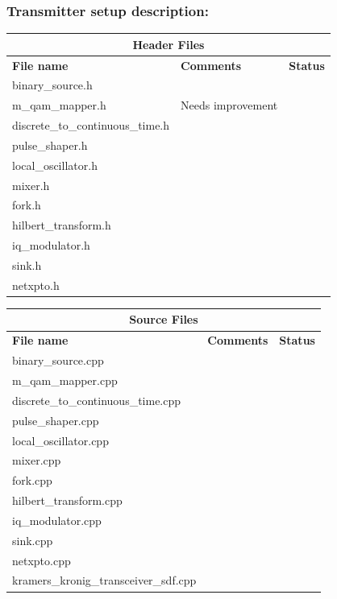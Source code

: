 \subsubsection{Transmitter setup description:}
\begin{center}
	\begin{tabular}{ |p{6cm}||p{7cm}|p{1cm}|   }
		\hline
		\multicolumn{3}{|c|}{\textbf{Header Files}} \\
		\hline
		\textbf{File name} & \textbf{Comments}&\textbf{Status}\\
		\hline
		binary\_source.h    				&  &\checkmark\\
		\hline
		m\_qam\_mapper.h 					& Needs improvement &\\
		\hline
		discrete\_to\_continuous\_time.h    &  &\checkmark\\
		\hline
		pulse\_shaper.h 					&  &\checkmark\\
		\hline
		local\_oscillator.h					&  &\checkmark\\
		\hline
		mixer.h		 						&  &\\
		\hline
		fork.h								&  &\\
		\hline
		hilbert\_transform.h				&  &\\
		\hline
		iq\_modulator.h						&  &\checkmark\\
		\hline
		sink.h								&  &\checkmark\\
		\hline
		netxpto.h							&  &\checkmark\\
		\hline
	\end{tabular}
\end{center}
\vspace{0.4cm}
\begin{center}
	\begin{tabular}{ |p{6cm}||p{7cm}|p{1cm}|   }
		\hline
		\multicolumn{3}{|c|}{\textbf{Source Files}} \\
		\hline
		\textbf{File name} & \textbf{Comments}&\textbf{Status}\\
		\hline
		binary\_source.cpp    				&  &\checkmark\\
		\hline
		m\_qam\_mapper.cpp 					&  &\\
		\hline
		discrete\_to\_continuous\_time.cpp  &  &\checkmark\\
		\hline
		pulse\_shaper.cpp 					&  &\checkmark\\
		\hline
		local\_oscillator.cpp				&  &\checkmark\\
		\hline
		mixer.cpp		 					&  &\\
		\hline
		fork.cpp							&  &\\
		\hline
		hilbert\_transform.cpp				&  &\\
		\hline
		iq\_modulator.cpp					&  &\checkmark\\
		\hline
		sink.cpp							&  &\checkmark\\
		\hline
		netxpto.cpp							&  &\checkmark\\
		\hline
		kramers\_kronig\_transceiver\_sdf.cpp  &  &\\
		\hline
	\end{tabular}
\end{center}

